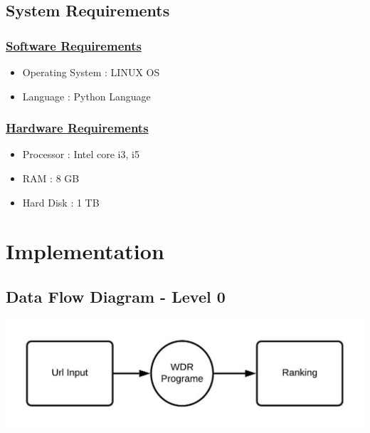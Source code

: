 \documentclass{fisatproject}
\begin{document}
\subsection{System Requirements}
\subsubsection{\underline{Software Requirements}}
\begin{itemize}
	\item Operating System : LINUX OS 
	
	\item Language : Python Language
\end{itemize}

\subsubsection{\underline{Hardware Requirements}}
\begin{itemize}
	\item Processor : Intel core i3, i5 
	\item RAM : 8 GB
	\item Hard Disk : 1 TB
	
\end{itemize}

\section{Implementation}
\subsection{Data Flow Diagram - Level 0}
\begin{flushleft}
	\centerline{\includegraphics[scale=1.2]{image/level_0_dfd.jpeg}}
\end{flushleft}
\end{document}
